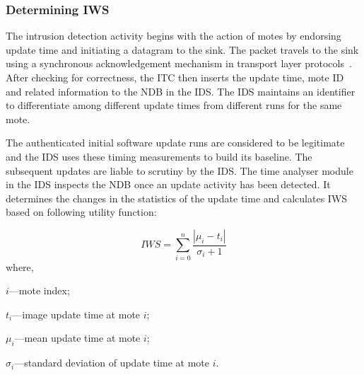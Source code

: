 \documentclass[conference]{IEEEtran}
\newcommand{\notedme}[1]{\raisebox{0pt}[0pt][0pt]{\pdfcomment[open=true,color=blue]{#1}}}
\begin{document}
\subsubsection*{Determining IWS}
\label{ssc:cal_iws}
The intrusion detection activity begins with the action of motes by endorsing update time and initiating a datagram to the sink. 
The packet travels to the sink using a synchronous acknowledgement mechanism in transport layer protocols~\cite{tep116}.
After checking for correctness, the ITC then inserts the update time, mote ID and related information to the NDB in the IDS.
The IDS maintains an identifier to differentiate among different update times from different runs for the same mote.
%

The authenticated initial software update runs are considered to be legitimate and the IDS uses these timing measurements to build its baseline.
The subsequent updates are liable to scrutiny by the IDS.
The time analyser module in the IDS inspects the NDB once an update activity has been detected.
It determines the changes in the statistics of the update time and calculates IWS based on following utility function:

\begin{equation}
\label{eqn2} 
	\mathit{IWS} = \sum \limits_{i=0}^{n} \frac{\left| \mu_i - t_i \right|}{\sigma_i + 1}
\end{equation}
where, 
\begin{inparaenum}
\item $\mathit{i}$---mote index;%
\item $\mathit{t_i}$---image update time at mote $\mathit{i}$;  
\item $\mathit{\mu_i}$---mean update time at mote $\mathit{i}$;  
\item $\mathit{\sigma_i}$---standard deviation of update time at mote $\mathit{i}$. 
\end{inparaenum}	
\end{document}
